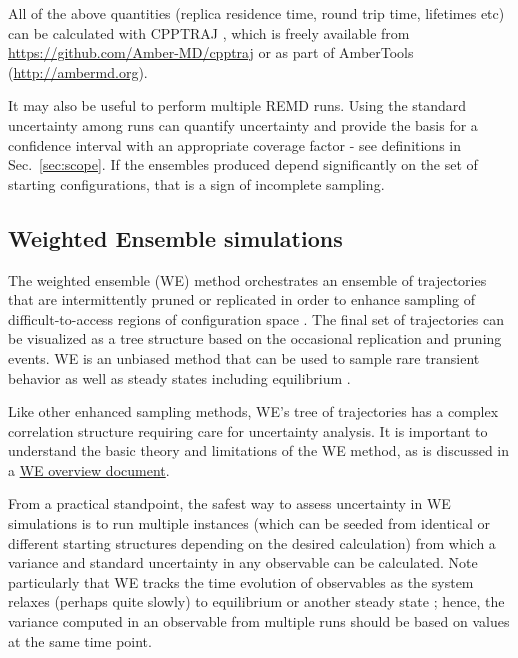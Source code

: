 All of the above quantities (replica residence time, round trip time, lifetimes etc) can be calculated with CPPTRAJ \citep{Roe2013}, which is freely available from \url{https://github.com/Amber-MD/cpptraj} or as part of AmberTools (\url{http://ambermd.org}).

It may also be useful to perform multiple REMD runs.  Using the standard uncertainty among runs can quantify uncertainty and provide the basis for a confidence interval with an appropriate coverage factor - see definitions in Sec.\ \ref{sec:scope}.  If the ensembles produced depend significantly on the set of starting configurations, that is a sign of incomplete sampling.

\subsection{Weighted Ensemble simulations}

The weighted ensemble (WE) method orchestrates an ensemble of trajectories that are intermittently pruned or replicated in order to enhance sampling of difficult-to-access regions of configuration space \cite{Huber-1996}.
The final set of trajectories can be visualized as a tree structure based on the occasional replication and pruning events.
WE is an unbiased method that can be used to sample rare transient behavior \cite{Zhang2010a} as well as steady states \cite{Bhatt2010a} including equilibrium \cite{Suarez2014}.

Like other enhanced sampling methods, WE's tree of trajectories has a complex correlation structure requiring care for uncertainty analysis.
It is important to understand the basic theory and limitations of the WE method, as is discussed in a
\href{https://westpa.github.io/westpa/overview.html}{WE overview document}.

From a practical standpoint, the safest way to assess uncertainty in WE simulations is to run multiple instances (which can be seeded from identical or different starting structures depending on the desired calculation) from which a variance and standard uncertainty in any observable can be calculated.
Note particularly that WE tracks the time evolution of observables as the system relaxes (perhaps quite slowly) to equilibrium or another steady state \cite{Zhang2010a}; hence, the variance computed in an observable from multiple runs should be based on values at the same time point.

